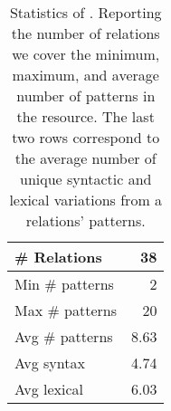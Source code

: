 \begin{table}[t]
    \centering
\begin{tabular}{lr}
  \toprule
    \# Relations &   38 \\
    \midrule
 Min \# patterns &    2 \\
 Max \# patterns &   20 \\
 Avg \# patterns &    8.63 \\
 \midrule
   Avg syntax &    4.74 \\
  Avg lexical &    6.03 \\
\bottomrule
\end{tabular}
    \caption{Statistics of \resource{}. Reporting the number of relations we cover the minimum, maximum, and average number of patterns in the resource.
    The last two rows correspond to the average number of unique syntactic and lexical variations from a relations' patterns.}
    \label{tab:rel-graph-stats}
\end{table}

